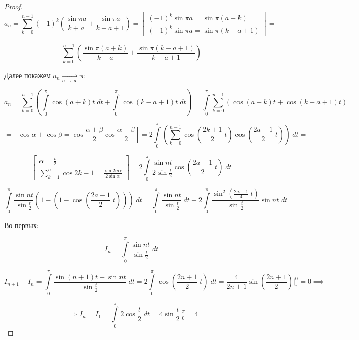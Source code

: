 \documentclass[../../main.tex]{subfiles}
\begin{document}
\begin{proof}
		\[ a_n =  \sum_{k=0}^{n-1} (-1)^k \left( \frac{\sin{\pi a} }{k+a} + \frac{\sin{\pi a} }{k-a+1} \right) = \left[  \begin{gathered}
		(-1)^k \sin{\pi a} = \sin{\pi \left( a + k \right) } \\
		(-1)^k \sin{\pi a} = \sin{\pi \left( k - a + 1 \right) }
		\end{gathered}  \right]  = \]
		
		
		
		
		\[ \sum_{k=0}^{n-1} \left( \frac{\sin{\pi \left( a + k \right)} }{k+a} + \frac{\sin{\pi \left( k - a + 1 \right)} }{k-a+1} \right)           \]
		
		Далее покажем $a_n {\underset{n \to \infty}\rightarrow} \pi $:
		
		\[   a_n = \sum_{k=0}^{n-1} \left( \int\limits_{0}^{\pi} \cos{(a+k)t} \; dt + \int\limits_{0}^{\pi} \cos{(k-a+1)t} \; dt \right) =  \int\limits_{0}^{\pi} \sum_{k=0}^{n-1} \left( \cos{(a+k)t} + \cos{(k-a+1)t} \right) =              \]
		
		\[ = \left[  \cos{\alpha} + \cos{\beta} = \cos{\frac{\alpha + \beta}{2}} \cos{\frac{\alpha - \beta}{2}}  \right] = 2 \int\limits_{0}^{\pi} \left( \sum_{k=0}^{n-1} \cos{\left( \frac{2k+1}{2} \; t\right) } \cos{\left( \frac{2a-1}{2} \; t\right)} \right) \; dt   =      \]
		
		
		\[  = \left[  \begin{gathered}
		\alpha = \frac{t}{2} \\
		\sum_{k=1}^{n} \cos{2k-1} = \frac{\sin{2n\alpha}}{2\sin{\alpha}}
		\end{gathered}    \right]  = 2  \int\limits_{0}^{\pi} \frac{\sin{nt}}{2\sin{\frac{t}{2}}} \cos{\left( \frac{2a-1}{2} \; t\right)}  \; dt =         \]
		
		
		\[ \int\limits_{0}^{\pi} \frac{\sin{nt}}{\sin{\frac{t}{2}}}\left( 1 - \left(  1- \cos{\left( \frac{2a-1}{2} \; t\right)} \right)  \right)   \; dt =
		\int\limits_{0}^{\pi} \frac{\sin{nt}}{\sin{\frac{t}{2}}} \; dt -  2 \int\limits_{0}^{\pi} \frac{\sin^2 {\left( \frac{2a-1}{4} \; t \right) }}{\sin{\frac{t}{2}}} \sin{nt} \; dt          \]
		
		Во-первых:
		
		\[  I_n =  \int\limits_{0}^{\pi} \frac{\sin{nt}}{\sin{\frac{t}{2}}} \; dt     \]
		
		\[  I_{n+1} - I_n =  \int\limits_{0}^{\pi} \frac{\sin{(n+1)t} - \sin{nt}}{\sin{\frac{t}{2}}} \; dt = 2 \int\limits_{0}^{\pi} \cos{\left(  \frac{2n+1}{2} \; t \right) } \; dt = \frac{4}{2n+1} \sin{\left( \frac{2n+1}{2} \right) } \bigg|_{\pi}^{0} = 0  \implies \]
		
		\[  \implies I_n = I_1 = \int\limits_{0}^{\pi} 2 \cos{\frac{t}{2}} \;  dt = 4 \sin{\frac{t}{2}} \bigg|_{0}^{\pi} = 4    \]
	\end{proof}	
\end{document}
